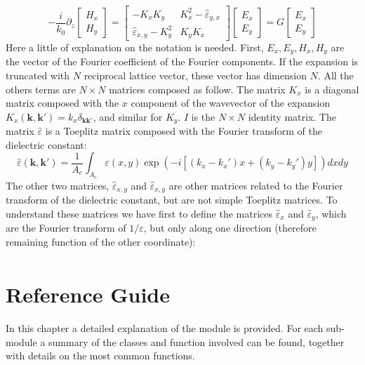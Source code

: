 \documentclass[a4paper,10pt]{report}
\begin{document}
\begin{equation}
-\frac{i}{k_0} \partial_z \left[ \begin{array}{c} H_x \\ H_y \end{array} \right] =
\left[ \begin{array}{cc} -K_xK_y & K_x^2 - \hat{\varepsilon}_{y,x} \\ \hat{\varepsilon}_{x,y} - K_y^2 & K_yK_x \end{array} \right]
\left[ \begin{array}{c} E_x \\ E_y \end{array} \right]= 
G \left[ \begin{array}{c} E_x \\ E_y \end{array} \right]
\end{equation}
Here a little of explanation on the notation is needed. First, $E_x,E_y,H_x,H_y$ are the vector of the Fourier coefficient of the Fourier components. If the expansion is truncated with $N$ reciprocal lattice vector, these vector has dimension $N$. All the others terms are $N \times N$ matrices composed as follow. The matrix $K_x$ is a diagonal matrix composed with the $x$ component of the wavevector of the expansion $K_x(\mathbf{k},\mathbf{k}') = k_x \delta_{\mathbf{k}\mathbf{k}'}$, and similar for $K_y$. $I$ is the $N \times N$ identity matrix.  The matrix $\hat{\varepsilon}$ is a Toeplitz matrix composed with the Fourier transform of the dielectric constant:
\begin{equation}
\hat{\varepsilon}(\mathbf{k},\mathbf{k}') = \frac{1}{A_c} \int_{A_c} \varepsilon(x,y)\exp(-i[(k_x-k_x')x+(k_y-k_y')y]) dxdy
\end{equation}
The other two matrices, $\hat{\varepsilon}_{x,y}$ and $\hat{\varepsilon}_{x,y}$ are other matrices related to the Fourier transform of the dielectric constant, but are not simple Toeplitz matrices. 
To understand these matrices we have first to define the matrices $\hat{\varepsilon}_{x}$ and $\hat{\varepsilon}_{y}$, which are the Fourier transform of $1/\varepsilon$, but only along one direction (therefore remaining function of the other coordinate):
\begin{align}

\end{align}

\chapter{Reference Guide}
In this chapter a detailed explanation of the module is provided. For each sub-module a summary of the classes and function involved can be found, together with details on the most common functions.
\end{document}
